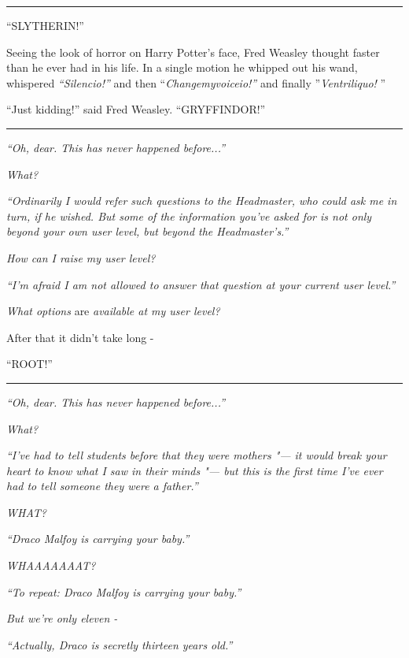 \begin{center}\rule{3in}{0.4pt}\end{center}

``SLYTHERIN!''

Seeing the look of horror on Harry Potter's face, Fred Weasley thought
faster than he ever had in his life. In a single motion he whipped out
his wand, whispered \emph{``Silencio!''} and then
``\emph{Changemyvoiceio!''} and finally ''\emph{Ventriliquo!} ''

``Just kidding!'' said Fred Weasley. ``GRYFFINDOR!''

\begin{center}\rule{3in}{0.4pt}\end{center}

\emph{``Oh, dear. This has never happened before...''}

\emph{What?}

\emph{``Ordinarily I would refer such questions to the Headmaster, who
could ask me in turn, if he wished. But some of the information you've
asked for is not only beyond your own user level, but beyond the
Headmaster's.''}

\emph{How can I raise my user level?}

\emph{``I'm afraid I am not allowed to answer that question at your
current user level.''}

\emph{What options} are \emph{available at my user level?}

After that it didn't take long -

``ROOT!''

\begin{center}\rule{3in}{0.4pt}\end{center}

\emph{``Oh, dear. This has never happened before...''}

\emph{What?}

\emph{``I've had to tell students before that they were mothers "--- it
would break your heart to know what I saw in their minds "--- but this is
the first time I've ever had to tell someone they were a father.''}

\emph{WHAT?}

\emph{``Draco Malfoy is carrying your baby.''}

\emph{WHAAAAAAAT?}

\emph{``To repeat: Draco Malfoy is carrying your baby.''}

\emph{But we're only eleven -}

\emph{``Actually, Draco is secretly thirteen years old.''}


